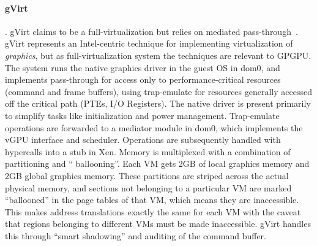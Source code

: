 \paragraph {\bf gVirt}. gVirt claims to be a full-virtualization but relies on mediated pass-through~\cite{gVirt}.
     gVirt represents an Intel-centric technique for implementing virtualization of \emph{graphics}, but as full-virtualization system
	 the techniques are relevant to GPGPU. The system runs the native graphics driver
	 in the guest OS in dom0, and implements pass-through for access only to performance-critical resources (command and frame buffers),
	 using trap-emulate for resources generally accessed off the critical path (PTEs, I/O Registers). The native driver is present
	 primarily to simplify tasks like initialization and power management. Trap-emulate
	 operations are forwarded to a mediator module in dom0, which implements the vGPU interface and scheduler. Operations are subsequently
	 handled with hypercalls into a stub in Xen. Memory is multiplexed with a combination of partitioning and `` ballooning''.
	 Each VM gets 2GB of local graphics memory and 2GB global graphics memory. These partitions are striped across the actual physical
	 memory, and sections not belonging to a particular VM are marked ``ballooned'' in the page tables of that VM, which means they
	 are inaccessible. This makes address translations exactly the same for each VM with the
	 caveat that regions belonging to different VMs must be made inaccessible. gVirt handles this through
	 ``smart shadowing'' and auditing of the command buffer.

